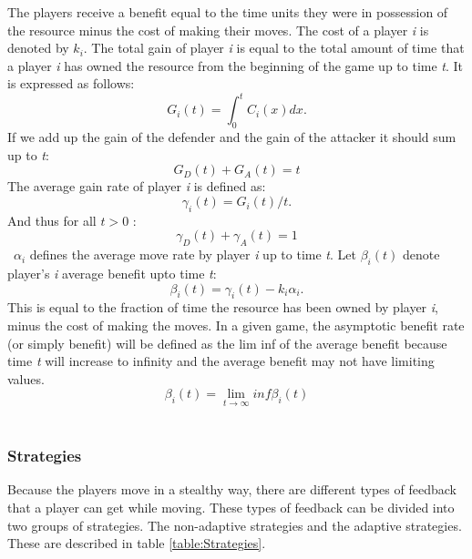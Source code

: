 The players receive a benefit equal to the time units they were in possession of the resource minus the cost of making their moves. The cost of a player \textit{i} is denoted by $k_{i}$. 
The total gain of player \textit{i} is equal to the total amount of time that a player \textit{i} has owned the resource from the beginning of the game up to time \textit{t}. It is expressed as follows:
\begin{equation}\label{first}
G_{i}(t) = \int_0^t \! C_{i}(x) dx.
\end{equation}
If we add up the gain of the defender and the gain of the attacker it should sum up to \textit{t}:
\begin{equation}\label{first}
G_{D}(t) + G_{A}(t) = t
\end{equation}
The average gain rate of player \textit{i} is defined as:
\begin{equation}\label{first}
\gamma_{i}(t) = G_{i}(t)/t.
\end{equation}
And thus for all $t > 0$ :
\begin{equation}\label{first}
\gamma_{D}(t) + \gamma_{A}(t) = 1
\end{equation}
~$ \alpha_{i}$ defines the average move rate by player \textit{i} up to time \textit{t}.
Let $\beta_{i}(t)$ denote player's \textit{i} average benefit upto time \textit{t}:
\begin{equation}\label{first}
\beta_{i}(t) = \gamma_{i}(t) - k_{i}\alpha_{i}.
\end{equation}
This is equal to the fraction of time the resource has been owned by player \textit{i}, minus the cost of making the moves.
In a given game, the asymptotic benefit rate (or simply benefit) will be defined as the lim inf of the average benefit because time\textit{ t} will increase to infinity and the average benefit may not have limiting values.
\begin{equation}
\beta_{i}(t)  = \lim_{t \to \infty} inf \beta_{i}(t) 
\end{equation}
\\


\subsubsection{Strategies}
Because the players move in a stealthy way, there are different types of feedback that a player can get while moving. These types of feedback can be divided into two groups of strategies. The non-adaptive strategies and the adaptive strategies. These are described in table \ref{table:Strategies}.\\

